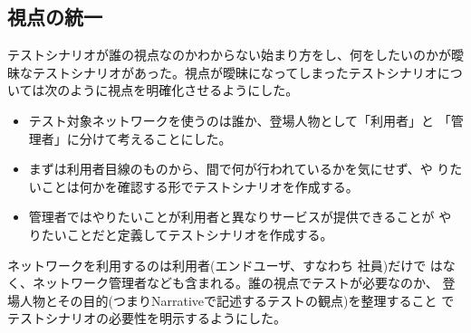   \subsection{視点の統一}
テストシナリオが誰の視点なのかわからない始まり方をし、何をしたいのかが曖
昧なテストシナリオがあった。視点が曖昧になってしまったテストシナリオにつ
いては次のように視点を明確化させるようにした。
\begin{itemize}
 \item テスト対象ネットワークを使うのは誰か、登場人物として「利用者」と
       「管理者」に分けて考えることにした。
 \item まずは利用者目線のものから、間で何が行われているかを気にせず、や
       りたいことは何かを確認する形でテストシナリオを作成する。
 \item 管理者ではやりたいことが利用者と異なりサービスが提供できることが
       やりたいことだと定義してテストシナリオを作成する。
\end{itemize}
ネットワークを利用するのは利用者(エンドユーザ、すなわち \yo 社員)だけで
はなく、ネットワーク管理者なども含まれる。誰の視点でテストが必要なのか、
登場人物とその目的(つまりNarrativeで記述するテストの観点)を整理すること
でテストシナリオの必要性を明示するようにした。


